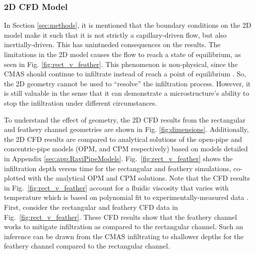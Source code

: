 \documentclass[%
 aip,
 amsmath,amssymb,
 reprint,%
floatfix]{revtex4-1}
\begin{document}
\subsubsection{2D CFD Model}
In Section \ref{sec:methods}, it is mentioned that the boundary conditions on the 2D model make it such that it is not strictly a capillary-driven flow, but also inertially-driven. This has unintneded consequences on the results. The limitations in the 2D model causes the flow to reach a state of equilibrium, as seen in Fig. \ref{fig:rect_v_feather}. This phenomenon is non-physical, since the CMAS should continue to infiltrate instead of reach a point of equilibrium \cite{Naraparaju2017}. So, the 2D geometry cannot be used to ``resolve'' the infiltration process. However, it is still valuable in the sense that it can demonstrate a microstructure's ability to stop the infiltration under different circumstances.

To understand the effect of geometry, the 2D CFD results from the rectangular and feathery channel geometries are shown in Fig. \ref{fig:dimensions}.
Additionally, the 2D CFD results are compared to analytical solutions of the open-pipe and concentric-pipe models (OPM, and CPM respectively) \cite{Naraparaju2019} based on models detailed in Appendix \ref{sec:app:RaviPipeModels}. 
Fig.~\ref{fig:rect_v_feather} shows the infiltration depth versus time for the rectangular and feathery simulations, co-plotted with the analytical OPM and CPM solutions. 
Note that the CFD results in Fig.~\ref{fig:rect_v_feather} account for a fluidic viscosity that varies with temperature which is based on polynomial fit to experimentally-measured data \cite{Naraparaju2017}.\\

First, consider the rectangular and feathery CFD data in Fig.~\ref{fig:rect_v_feather}.
These CFD results show that the feathery channel works to mitigate infiltration as compared to the rectangular channel. Such an inference can be drawn from the CMAS infiltrating to shallower depths for the feathery channel compared to the rectangular channel. 
\end{document}
